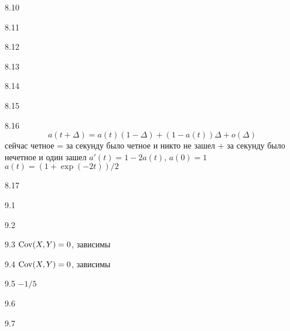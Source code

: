 \protect \hypertarget {soln:8.10}{}
\begin{solution}{{8.10}}
\end{solution}
\protect \hypertarget {soln:8.11}{}
\begin{solution}{{8.11}}
\end{solution}
\protect \hypertarget {soln:8.12}{}
\begin{solution}{{8.12}}
\end{solution}
\protect \hypertarget {soln:8.13}{}
\begin{solution}{{8.13}}
\end{solution}
\protect \hypertarget {soln:8.14}{}
\begin{solution}{{8.14}}
\end{solution}
\protect \hypertarget {soln:8.15}{}
\begin{solution}{{8.15}}
\end{solution}
\protect \hypertarget {soln:8.16}{}
\begin{solution}{{8.16}}
  \[ a(t+\Delta)=a(t)(1-\Delta)+(1-a(t))\Delta + o(\Delta) \]
  сейчас четное = за секунду было четное и никто не зашел + за секунду было нечетное и один зашел
  $a'(t)=1-2a(t)$, $a(0)=1$
  $a(t)=(1+\exp(-2t))/2$
\end{solution}
\protect \hypertarget {soln:8.17}{}
\begin{solution}{{8.17}}
\end{solution}
\protect \hypertarget {soln:9.1}{}
\begin{solution}{{9.1}}
\end{solution}
\protect \hypertarget {soln:9.2}{}
\begin{solution}{{9.2}}
\end{solution}
\protect \hypertarget {soln:9.3}{}
\begin{solution}{{9.3}}
      $\operatorname{Cov}(X,Y)=0$, зависимы
\end{solution}
\protect \hypertarget {soln:9.4}{}
\begin{solution}{{9.4}}
  $\operatorname{Cov}(X,Y)=0$, зависимы
\end{solution}
\protect \hypertarget {soln:9.5}{}
\begin{solution}{{9.5}}
  $-1/5$
\end{solution}
\protect \hypertarget {soln:9.6}{}
\begin{solution}{{9.6}}
\end{solution}
\protect \hypertarget {soln:9.7}{}
\begin{solution}{{9.7}}
\end{solution}
